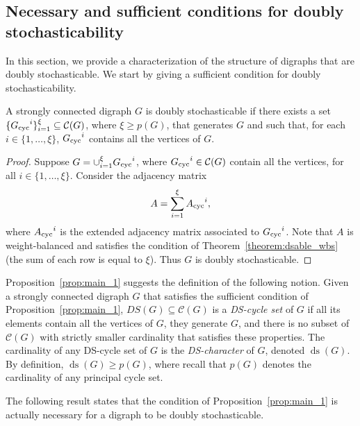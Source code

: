 \documentclass[final]{siamltex}
\begin{document}
\subsection{Necessary and sufficient conditions for doubly
  stochasticability}\label{sec:ds}

In this section, we provide a characterization of the structure of
digraphs that are doubly stochasticable. We start by giving a
sufficient condition for doubly stochasticability.

\begin{proposition}\label{prop:main_1}
  A strongly connected digraph $G$ is doubly stochasticable if there
  exists a set $ \{{{G}_{\textup{{cyc}}}}^i\}_{i=1}^{\xi} \subseteq
  \mathcal{C}(G) $, where $ \xi \geq p(G) $, that generates $G$ and
  such that, for each $ i\in \{1,\ldots, \xi\} $, $ {{G}_{\textup{{cyc}}}}^i$
  contains all the vertices of $G$.
\end{proposition}
\begin{proof} 
  Suppose $ G=\cup_{i=1}^{\xi}{{G}_{\textup{{cyc}}}}^i $,
  where $ {{G}_{\textup{{cyc}}}}^i\in \mathcal{C}(G) $ contain all the
  vertices, for all $ i\in \{1,\ldots, \xi\} $.  Consider the
  adjacency matrix
  \begin{equation*}
    A=\sum_{i=1}^{\xi}{{A}_{\textup{{cyc}}}}^i,
  \end{equation*}
  where $ {{A}_{\textup{{cyc}}}}^i $ is the extended adjacency matrix
  associated to $ {{G}_{\textup{{cyc}}}}^i $. Note that $A$ is
  weight-balanced and satisfies the condition of
  Theorem~\ref{theorem:dsable_wbs} (the sum of each row is equal to
  $\xi$). Thus $G$ is doubly stochasticable.
\end{proof}

Proposition~\ref{prop:main_1} suggests the definition of the following
notion. Given a strongly connected digraph $G$ that satisfies the
sufficient condition of Proposition~\ref{prop:main_1}, $DS(G)\subseteq
\mathcal{C}(G) $ is a \emph{DS-cycle set} of $G $ if all its elements
contain all the vertices of $G$, they generate $G$, and there is no
subset of $ \mathcal{C}(G) $ with strictly smaller cardinality that
satisfies these properties.  The cardinality of any DS-cycle set of $
G $ is the \emph{DS-character} of $ G $, denoted $ {\operatorname{ds}}(G)$.  By
definition, $ {\operatorname{ds}}(G)\geq p(G) $, where recall that $p(G)$ denotes the
cardinality of any principal cycle set.

The following result states that the condition of
Proposition~\ref{prop:main_1} is actually necessary for a digraph to be
doubly stochasticable.
  
\end{document}

